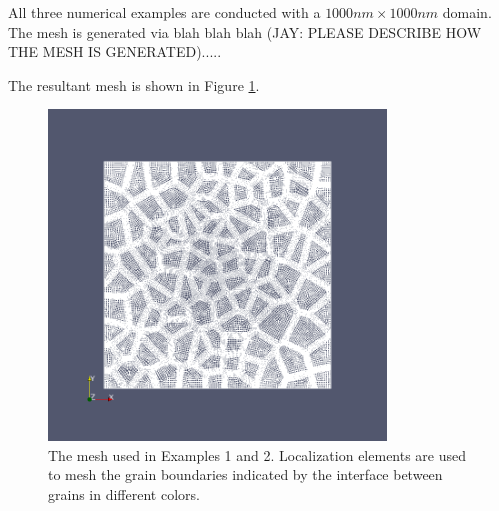 \documentclass[10pt]{elsarticle}
\begin{document}

All three numerical examples are conducted with a $1000nm \times 1000nm$ domain. The mesh is generated via blah blah blah (JAY: PLEASE DESCRIBE HOW THE MESH IS GENERATED)..... 

The resultant mesh is shown in Figure \ref{fig:mesh}. 
\begin{figure}[h!]
  \centering
    \includegraphics[trim = 0mm 0mm 0mm 0mm, clip,width=0.8\textwidth]{images/mesh_2D.png}
    \caption{The mesh used in Examples 1 and 2. Localization elements are
    used to mesh the grain boundaries indicated by the interface between grains 
    in different colors.}
    \label{fig:mesh}
\end{figure}
\end{document}
